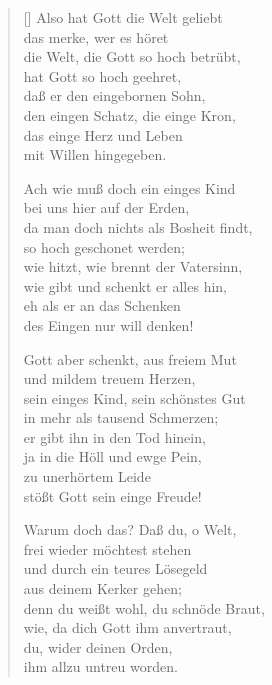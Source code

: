 \begin{multicols}{2}
\settowidth{\versewidth}{sein Kreuz und Leiden ist mein Schmuck,}
\begin{verse}[\versewidth]
 Also hat Gott die Welt geliebt\\
das merke, wer es höret\\
die Welt, die Gott so hoch betrübt,\\
hat Gott so hoch geehret,\\
daß er den eingebornen Sohn,\\
den eingen Schatz, die einge Kron,\\
das einge Herz und Leben\\
mit Willen hingegeben.

 Ach wie muß doch ein einges Kind\\
bei uns hier auf der Erden,\\
da man doch nichts als Bosheit findt,\\
so hoch geschonet werden;\\
wie hitzt, wie brennt der Vatersinn,\\
wie gibt und schenkt er alles hin,\\
eh als er an das Schenken\\
des Eingen nur will denken!

 Gott aber schenkt, aus freiem Mut\\
und mildem treuem Herzen,\\
sein einges Kind, sein schönstes Gut\\
in mehr als tausend Schmerzen;\\
er gibt ihn in den Tod hinein,\\
ja in die Höll und ewge Pein,\\
zu unerhörtem Leide\\
stößt Gott sein einge Freude!

 Warum doch das? Daß du, o Welt,\\
frei wieder möchtest stehen\\
und durch ein teures Lösegeld\\
aus deinem Kerker gehen;\\
denn du weißt wohl, du schnöde Braut,\\
wie, da dich Gott ihm anvertraut,\\
du, wider deinen Orden,\\
ihm allzu untreu worden.


\end{verse}
\end{multicols}
